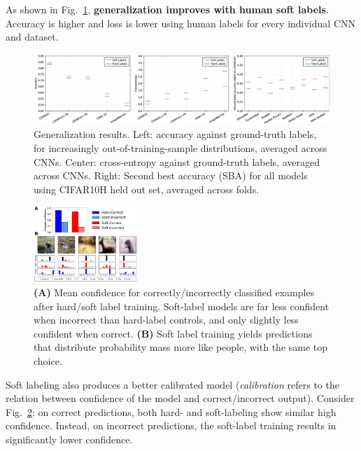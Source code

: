 As shown in Fig.~\ref{fig:peterson_2}, \textbf{generalization improves with human soft labels}. Accuracy is higher and loss is lower using human labels for every individual CNN and dataset.

\begin{figure}[!ht]
    \centering
    \captionsetup{width=.8\linewidth}
    \includegraphics[width=0.9\linewidth]{images/peterson_2.png}
    \caption{Generalization results. Left: accuracy against ground-truth labels, for increasingly out-of-training-sample distributions, averaged across CNNs. Center: cross-entropy against ground-truth labels, averaged across CNNs. Right: Second best accuracy (SBA) for all models using CIFAR10H held out set, averaged across folds.}
    \label{fig:peterson_2}
\end{figure}

\begin{figure}
  \centering
  \includegraphics[width=0.35\textwidth]{images/peterson_3.png}
  \caption{\textbf{(A)} Mean confidence for correctly/incorrectly classified examples after hard/soft label training. Soft-label models are far less confident when incorrect than hard-label controls, and only slightly less confident when correct. \textbf{(B)} Soft label training yields predictions that distribute probability mass more like people, with the same top choice.}
  \label{fig:peterson_3}
\end{figure}

Soft labeling also produces a better calibrated model (\textit{calibration} refers to the relation between confidence of the model and correct/incorrect output). Consider Fig.~\ref{fig:peterson_3}: on correct predictions, both hard- and soft-labeling show similar high confidence. Instead, on incorrect predictions, the soft-label training results in significantly lower confidence.\\


